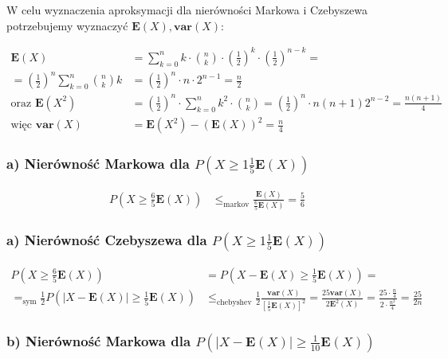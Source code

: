\documentclass{article}
\begin{document}
\noindent
W celu wyznaczenia aproksymacji dla nierówności Markowa i Czebyszewa
potrzebujemy wyznaczyć $\mathbf{E}(X), \mathbf{var}(X)$:

\begin{align}
    \mathbf{E}(X) &= \sum_{k=0}^{n} k \cdot \binom{n}{k}\cdot \left(\frac{1}{2}\right)^k\cdot \left(\frac{1}{2}\right)^{n-k} =\\
    =\left(\frac{1}{2}\right)^n \sum_{k=0}^{n} \binom{n}{k} k &= \left(\frac{1}{2}\right)^n \cdot n \cdot 2^{n-1} = \frac{n}{2}\\
    \text{oraz } \mathbf{E}(X^2) &= \left(\frac{1}{2}\right)^n \cdot \sum_{k=0}^{n} k^2 \cdot \binom{n}{k} = \left(\frac{1}{2}\right)^n \cdot n(n+1)2^{n-2} = \frac{n(n+1)}{4}\\
    \text{więc } \textbf{var}(X) &= \mathbf{E}(X^2) - (\mathbf{E}(X))^2 = \frac{n}{4}
\end{align}

\noindent

\subsubsection{a) Nierówność Markowa dla $P(X\geq 1 \frac{1}{5} \mathbf{E}(X))$}

\begin{align*}
    P\left(X\geq \frac{6}{5} \mathbf{E}(X)\right) &\leq_{\text{markov}} \frac{\mathbf{E}(X)}{\frac{6}{5}\mathbf{E}(X)} = \frac{5}{6}
\end{align*}

\subsubsection{a) Nierówność Czebyszewa dla $P(X\geq 1 \frac{1}{5} \mathbf{E}(X))$}

\begin{align*}
    P\left(X\geq \frac{6}{5} \mathbf{E}(X)\right) &= P\left(X-\mathbf{E}(X) \geq \frac{1}{5} \mathbf{E}(X)\right)=\\
    =_{\text{sym}} \frac{1}{2}P\left(|X-\mathbf{E}(X)| \geq \frac{1}{5} \mathbf{E}(X) \right) &\leq_{\text{chebyshev}} \frac{1}{2} \frac{\mathbf{var}(X)}{\left[\frac{1}{5}\mathbf{E}(X)\right]^2} = \frac{25\mathbf{var}(X)}{2\mathbf{E}^2(X)} = \frac{25\cdot\frac{n}{4}}{2\cdot \frac{n^2}{4}} = \frac{25}{2n}
\end{align*}

\subsubsection{b) Nierówność Markowa dla $P(|X - \mathbf{E}(X)| \geq \frac{1}{10} \mathbf{E}(X))$}
\end{document}
